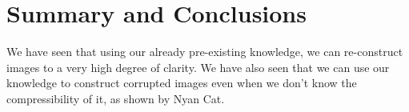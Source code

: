 \documentclass[11pt]{amsart}
\begin{document}




\section{Summary and Conclusions}\label{sec:conclusions}
We have seen that using our already pre-existing knowledge, we can re-construct 
images to a very high degree of clarity. We have also seen that we can use our
knowledge to construct corrupted images even when we don't know the compressibility of it, as 
shown by Nyan Cat. 

\end{document}
